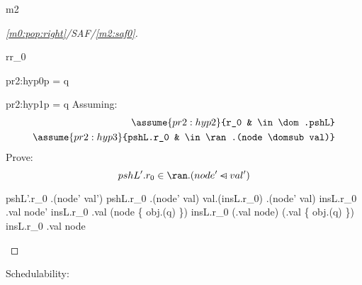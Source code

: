 \documentclass[12pt]{amsart}
\begin{document}
\begin{machine}{m2}
\begin{proof}[\ref{m0:pop:right}/SAF/\ref{m2:saf0}]
\begin{free:var}{r}{r_0}
\begin{by:cases}
\begin{case}{pr2:hyp0}{p = q}
	\easy
\end{case}
\begin{case}{pr2:hyp1}{\neg p = q}
	Assuming:
	\begin{align*}
		\assume{pr2:hyp2}{r_0 & \in \dom.pshL}
	\\  \assume{pr2:hyp3}{pshL.r_0 & \in \ran.(node \domsub val)}
	\end{align*}
	Prove:
	\[ \goal{pshL'.r_0 \in \ran.(node' \domsub val')} \]
	\begin{calculation}
		pshL'.r_0 \in \ran.(node' \domsub val')
		pshL.r_0 \in \ran.(node' \domsub val)
		val.(insL.r_0) \in \ran.(node' \domsub val)
		insL.r_0 \in \dom.val \setminus node'
	\hint{=}{ \eqref{m2:a1} }
		insL.r_0 \in \dom.val \setminus (node \setminus \{ obj.(q) \})
	\hint{=}{  }
		insL.r_0 \in (\dom.val \setminus node) \bunion (\dom.val \binter \{ obj.(q) \})
	\hint{\follows}{  }
		insL.r_0 \in \dom.val \setminus node
		\true
	\end{calculation}
\end{case}
\end{by:cases}
\end{free:var}
\end{proof}

Schedulability:
\begin{align*}
\end{align*}
\begin{align*}
\end{align*}


\end{machine}
\end{document}
